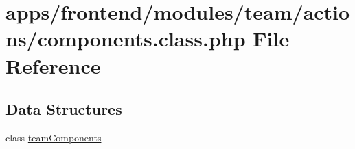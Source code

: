 \hypertarget{components_8class_8php}{\section{apps/frontend/modules/team/actions/components.class.\-php File Reference}
\label{components_8class_8php}
}
\subsection*{Data Structures}
\begin{DoxyCompactItemize}
\item 
class \hyperlink{classteam_components}{team\-Components}
\end{DoxyCompactItemize}
